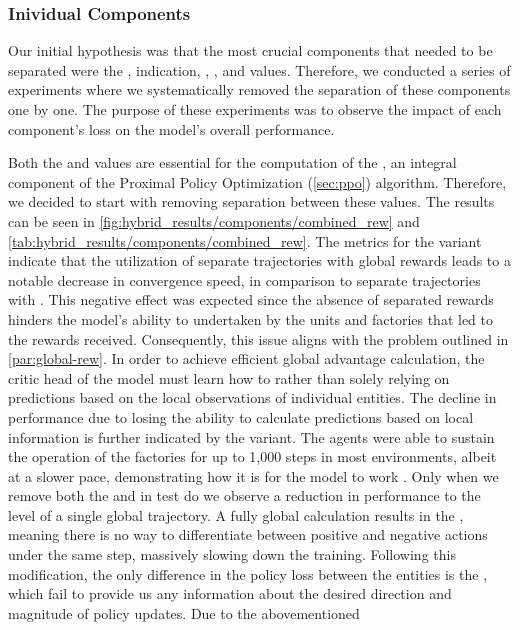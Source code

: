 \subsubsection{Inividual Components}
\label{subsec:individual-components}

\noindent Our initial hypothesis was that the most crucial components that needed to be separated were the ,  indication, , , and  values. Therefore, we conducted a series of experiments where we systematically removed the separation of these components one by one. The purpose of these experiments was to observe the impact of each component's loss on the model's overall performance.

\bigskip

\noindent Both the  and  values are essential for the computation of the , an integral component of the Proximal Policy Optimization (\autoref{sec:ppo}) algorithm. Therefore, we decided to start with removing separation between these values. The results can be seen in \autoref{fig:hybrid_results/components/combined_rew} and \autoref{tab:hybrid_results/components/combined_rew}. The metrics for the  variant indicate that the utilization of separate trajectories with global rewards leads to a notable decrease in convergence speed, in comparison to separate trajectories with . This negative effect was expected since the absence of separated rewards hinders the model's ability to  undertaken by the units and factories that led to the rewards received. Consequently, this issue aligns with the problem outlined in \autoref{par:global-rew}. In order to achieve efficient global advantage calculation, the critic head of the model must learn how to  rather than solely relying on predictions based on the local observations of individual entities. The decline in performance due to losing the ability to calculate  predictions based on local information is further indicated by the  variant. The agents were able to sustain the operation of the factories for up to 1,000 steps in most environments, albeit at a slower pace, demonstrating how  it is for the model to work . Only when we remove both the  and  in test  do we observe a reduction in performance to the level of a single global trajectory. A fully global  calculation results in the , meaning there is no way to differentiate between positive and negative actions under the same step, massively slowing down the training. Following this modification, the only difference in the policy loss between the entities is the , which fail to provide us any information about the desired direction and magnitude of policy updates. Due to the abovementioned 